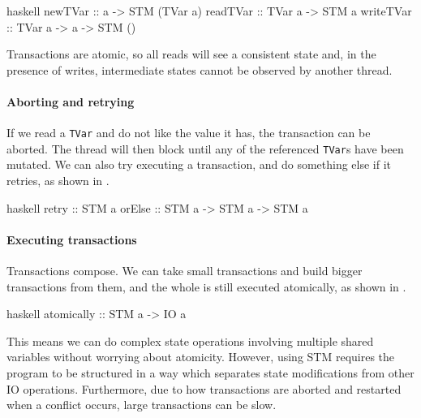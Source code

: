 \begin{listing}
\centering
\begin{cminted}{haskell}
newTVar   :: a -> STM (TVar a)
readTVar  :: TVar a -> STM a
writeTVar :: TVar a -> a -> STM ()
\end{cminted}
\caption{Transactional variables in Haskell.}\label{lst:tvars_haskell}
\end{listing}

Transactions are atomic, so all reads will see a consistent state and,
in the presence of writes, intermediate states cannot be observed by
another thread.

\paragraph{Aborting and retrying}
If we read a \verb|TVar| and do not like the value it has, the
transaction can be aborted.  The thread will then block until any of
the referenced \verb|TVar|s have been mutated.  We can also try
executing a transaction, and do something else if it retries, as shown
in .

\begin{listing}
\centering
\begin{cminted}{haskell}
retry  :: STM a
orElse :: STM a -> STM a -> STM a
\end{cminted}
\caption{Aborting and retrying transactions in Haskell.}\label{lst:orelse_haskell}
\end{listing}

\paragraph{Executing transactions}
Transactions compose.  We can take small transactions and build bigger
transactions from them, and the whole is still executed atomically, as
shown in .

\begin{listing}
\centering
\begin{cminted}{haskell}
atomically :: STM a -> IO a
\end{cminted}
\caption{Executing transactions in Haskell.}\label{lst:atomically_haskell}
\end{listing}

This means we can do complex state operations involving multiple
shared variables without worrying about atomicity.  However, using STM
requires the program to be structured in a way which separates state
modifications from other IO operations.  Furthermore, due to how
transactions are aborted and restarted when a conflict occurs, large
transactions can be slow\cite{le2015}.

